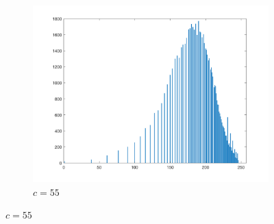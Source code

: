 \documentclass{article}
\begin{document}
\begin{enumerate}[label=(\alph*)]
\begin{figure}[!htb]
\begin{subfigure}[b]{0.3\textwidth}
            \includegraphics[width=\textwidth]{img/hist_LT55.png}
            \caption{$c = 55$}
        \end{subfigure}
        
        

\end{figure}
\end{enumerate}
\end{document}
